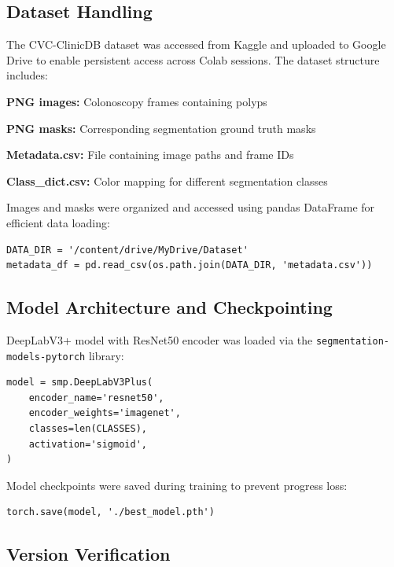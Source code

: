 \documentclass[a4paper,12pt]{report}
\begin{document}
\vspace{1em}

\subsection{Dataset Handling}

The CVC-ClinicDB dataset was accessed from Kaggle and uploaded to Google Drive to enable persistent access across Colab sessions. The dataset structure includes:

\textbf{PNG images:} Colonoscopy frames containing polyps

\textbf{PNG masks:} Corresponding segmentation ground truth masks

\textbf{Metadata.csv:} File containing image paths and frame IDs

\textbf{Class\_dict.csv:} Color mapping for different segmentation classes

Images and masks were organized and accessed using pandas DataFrame for efficient data loading:
\begin{verbatim}
DATA_DIR = '/content/drive/MyDrive/Dataset'
metadata_df = pd.read_csv(os.path.join(DATA_DIR, 'metadata.csv'))
\end{verbatim}

\vspace{1em}

\subsection{Model Architecture and Checkpointing}

DeepLabV3+ model with ResNet50 encoder was loaded via the \texttt{segmentation-models-pytorch} library:
\begin{verbatim}
model = smp.DeepLabV3Plus(
    encoder_name='resnet50',
    encoder_weights='imagenet',
    classes=len(CLASSES),
    activation='sigmoid',
)
\end{verbatim}

Model checkpoints were saved during training to prevent progress loss:
\begin{verbatim}
torch.save(model, './best_model.pth')
\end{verbatim}

\vspace{1em}

\subsection{Version Verification}
\end{document}
